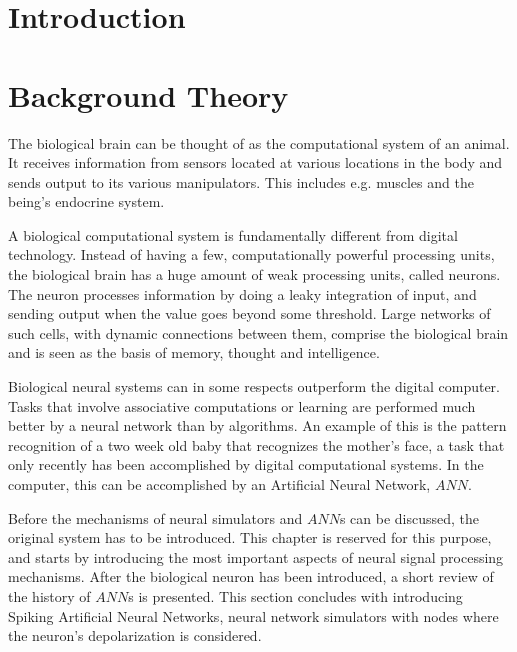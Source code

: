 \documentclass[b5paper,12 pt]{report}
\begin{document}
\tableofcontents 
\cleardoublepage %

\listoffigures

\cleardoublepage

\setcounter{page}{1} %






\chapter{Introduction}


\chapter{Background Theory}
\label{chBackgroundTheory}

	The biological brain can be thought of as the computational system of an animal.
	It receives information from sensors located at various locations in the body and sends output to its various manipulators.
	This includes e.g. muscles and the being's endocrine system.

	A biological computational system is fundamentally different from digital technology.
	Instead of having a few, computationally powerful processing units, the biological brain has a huge amount of weak processing units, called neurons.
	The neuron processes information by doing a leaky integration of input, and sending output when the value goes beyond some threshold\cite{TrevesNeuralNetworks}.
	Large networks of such cells, with dynamic connections between them, comprise the biological brain and is seen as the basis of memory, thought and intelligence.
	

	Biological neural systems can in some respects outperform the digital computer.
	Tasks that involve associative computations or learning are performed much better by a neural network than by algorithms. %
	An example of this is the pattern recognition of a two week old baby that recognizes the mother's face, a task that only recently has been accomplished by digital computational systems. %
	In the computer, this can be accomplished by an Artificial Neural Network, $ANN$.

	Before the mechanisms of neural simulators and $ANN$s can be discussed, the original system has to be introduced.
	This chapter is reserved for this purpose, and starts by introducing the most important aspects of neural signal processing mechanisms.
 	After the biological neuron has been introduced, a short review of the history of $ANN$s is presented.
	This section concludes with introducing Spiking Artificial Neural Networks, neural network simulators with nodes where the neuron's depolarization is considered. %
\end{document}
